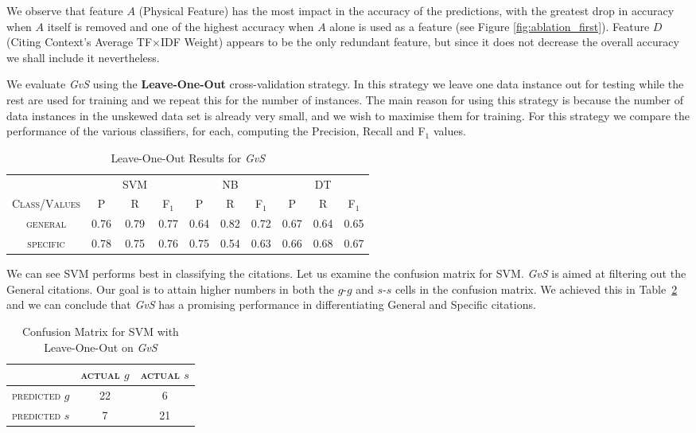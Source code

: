 We observe that feature $A$ (Physical Feature) has the most impact in the accuracy of the predictions, with the greatest drop in accuracy when $A$ itself is removed and one of the highest accuracy when $A$ alone is used as a feature (see Figure \ref{fig:ablation_first}). Feature $D$ (Citing Context's Average TF$\times$IDF Weight) appears to be the only redundant feature, but since it does not decrease the overall accuracy we shall include it nevertheless.

We evaluate \textit{GvS} using the \textbf{Leave-One-Out} cross-validation strategy. In this strategy we leave one data instance out for testing while the rest are used for training and we repeat this for the number of instances. The main reason for using this strategy is because the number of data instances in the unskewed data set is already very small, and we wish to maximise them for training. For this strategy we compare the performance of the various classifiers, for each, computing the Precision, Recall and F$_1$ values.

\begin{table}[h]
	\center
	\begin{tabular}{ c | c  c  c | c c c | c c c}
		& & SVM & & & NB & & & DT \\
		\textsc{Class/Values} & \textsc{P} & \textsc{R} & \textsc{F$_1$} & \textsc{P} & \textsc{R} & \textsc{F$_1$} & \textsc{P} & \textsc{R} & \textsc{F$_1$} \\
		\hline
		\textsc{general} 			& 0.76  &    0.79   &   0.77 & 0.64   &   0.82   &   0.72 & 0.67  &    0.64  &    0.65 \\
		\textsc{specific} 			& 0.78  &    0.75   &   0.76 & 0.75   &   0.54   &   0.63 & 0.66  &    0.68  &    0.67 \\
	\end{tabular}
	\caption{Leave-One-Out Results for {\it GvS}}
	\label{tab:firsttieresults}
\end{table}

We can see SVM performs best in classifying the citations. Let us examine the confusion matrix for SVM. \textit{GvS} is aimed at filtering out the General citations. Our goal is to attain higher numbers in both the $g$-$g$ and $s$-$s$ cells in the confusion matrix. We achieved this in Table~\ref{tab:firstsvmconfusionmatrix} and we can conclude that \textit{GvS} has a promising performance in differentiating General and Specific citations.

\begin{table}[h]
	\center
	\begin{tabular}{ c | c  c }
		 & \textsc{actual $g$} & \textsc{actual $s$} \\
		\hline
		\textsc{predicted $g$} 	& 22 & 6 \\
		\textsc{predicted $s$}		& 7 & 21
	\end{tabular}
	\caption{Confusion Matrix for SVM with Leave-One-Out on {\it GvS}}
	\label{tab:firstsvmconfusionmatrix}
\end{table}

